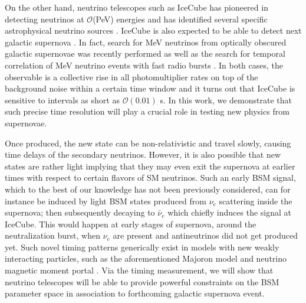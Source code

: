 On the other hand, neutrino telescopes such as IceCube has pioneered in detecting neutrinos at $\mathcal{O}$(PeV) energies \cite{IceCube:2014stg,IceCube:2018cha} and has identified several specific astrophysical neutrino sources \cite{IceCube:2018cha,IceCube:2023ame,IceCube:2022der}.
IceCube is also expected to be able to detect next galactic supernova  \cite{Kopke_2011}. In fact, search for MeV neutrinos from optically obscured galactic supernovae was recently performed \cite{IceCube:2023ogt} as well as the search for temporal correlation of MeV neutrino events with fast radio bursts \cite{IceCube:2019acm}. In both cases, the observable is a collective rise in all photomultiplier rates on top of the background noise  within a certain time window and it turns out that IceCube is sensitive to intervals as short as $\mathcal{O}(0.01)$ s. 
In this work, we demonstrate that such precise time resolution will play a crucial role in testing new physics from supernovae.   

 Once produced, the new state can be non-relativistic and travel slowly, causing time delays of the secondary neutrinos. However, it is also possible that new states are rather light implying that they may even exit the supernova at earlier times with respect to certain flavors of SM neutrinos. Such an early BSM signal, which to the best of our knowledge has not been previously considered, can for instance be induced by light BSM states produced from $\nu_e$ scattering inside the supernova; then subsequently decaying to $\bar{\nu}_e$ which chiefly induces the signal at IceCube. This would happen at early stages of supernova, around the neutralization burst, when $\nu_e$ are present and antineutrinos did not get produced yet. Such novel timing patterns generically exist in models with new weakly interacting particles, such as the aforementioned Majoron model \cite{Fiorillo:2022cdq} and neutrino magnetic moment portal \cite{Magill:2018jla,Brdar:2020quo}.
Via the timing measurement, we will show that neutrino telescopes will be able to provide powerful constraints on the BSM parameter space in association to forthcoming galactic supernova event.\\